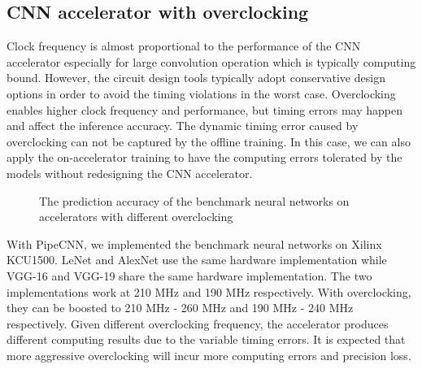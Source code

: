 \subsection{CNN accelerator with overclocking}
Clock frequency is almost proportional to the performance of the CNN accelerator 
especially for large convolution operation which is typically computing bound. 
However, the circuit design tools typically adopt conservative design options 
in order to avoid the timing violations in the worst case. Overclocking enables 
higher clock frequency and performance, but timing errors may happen and affect 
the inference accuracy. The dynamic timing error caused by overclocking 
can not be captured by the offline training. In this case, we can also 
apply the on-accelerator training to have the computing errors tolerated 
by the models without redesigning the CNN accelerator.
\begin{figure}
        \center
	\qquad
	\qquad
        \qquad
	\caption{The prediction accuracy of the benchmark neural networks on accelerators with different overclocking}
        \label{fig:overclock-accuracy}
\end{figure}


With PipeCNN, we implemented the benchmark neural networks on Xilinx KCU1500. 
LeNet and AlexNet use the same hardware implementation 
while VGG-16 and VGG-19 share the same hardware implementation. 
The two implementations work at 210 MHz and 190 MHz respectively.
With overclocking, they can be boosted to 210 MHz - 260 MHz and 
190 MHz - 240 MHz respectively. Given different overclocking frequency, 
the accelerator produces different computing results due to the variable
timing errors. It is expected that more aggressive overclocking will incur 
more computing errors and precision loss. 

